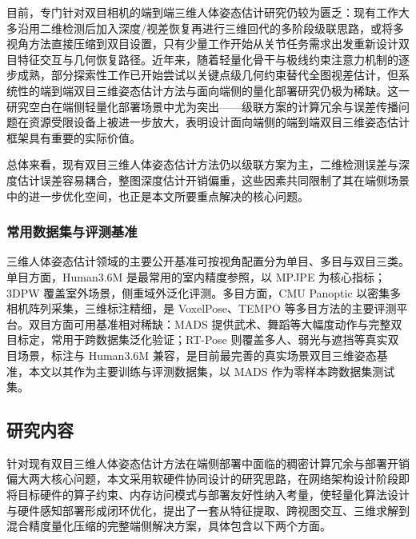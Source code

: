 目前，专门针对双目相机的端到端三维人体姿态估计研究仍较为匮乏：现有工作大多沿用二维检测后加入深度/视差恢复再进行三维回代的多阶段级联思路，或将多视角方法直接压缩到双目设置，只有少量工作开始从关节任务需求出发重新设计双目特征交互与几何恢复路径。近年来，随着轻量化骨干与极线约束注意力机制的逐步成熟，部分探索性工作已开始尝试以关键点级几何约束替代全图视差估计，但系统性的端到端双目三维姿态估计方法与面向端侧的量化部署研究仍极为稀缺。这一研究空白在端侧轻量化部署场景中尤为突出——级联方案的计算冗余与误差传播问题在资源受限设备上被进一步放大，表明设计面向端侧的端到端双目三维姿态估计框架具有重要的实际价值。

总体来看，现有双目三维人体姿态估计方法仍以级联方案为主，二维检测误差与深度估计误差容易耦合，整图深度估计开销偏重，这些因素共同限制了其在端侧场景中的进一步优化空间，也正是本文所要重点解决的核心问题。
\subsubsection{常用数据集与评测基准}
\label{subsec:related_datasets}
三维人体姿态估计领域的主要公开基准可按视角配置分为单目、多目与双目三类。单目方面，Human3.6M 是最常用的室内精度参照，以 MPJPE 为核心指标；3DPW 覆盖室外场景，侧重域外泛化评测。多目方面，CMU Panoptic 以密集多相机阵列采集，三维标注精细，是 VoxelPose、TEMPO 等多目方法的主要评测平台。双目方面可用基准相对稀缺：MADS 提供武术、舞蹈等大幅度动作与完整双目标定，常用于跨数据集泛化验证；RT-Pose 则覆盖多人、弱光与遮挡等真实双目场景，标注与 Human3.6M 兼容，是目前最完善的真实场景双目三维姿态基准，本文以其作为主要训练与评测数据集，以 MADS 作为零样本跨数据集测试集。


\subsection{研究内容}
\label{subsec:intro_contribution}
针对现有双目三维人体姿态估计方法在端侧部署中面临的稠密计算冗余与部署开销偏大两大核心问题，本文采用软硬件协同设计的研究思路，在网络架构设计阶段即将目标硬件的算子约束、内存访问模式与部署友好性纳入考量，使轻量化算法设计与硬件感知部署形成闭环优化，提出了一套从特征提取、跨视图交互、三维求解到混合精度量化压缩的完整端侧解决方案，具体包含以下两个方面。

